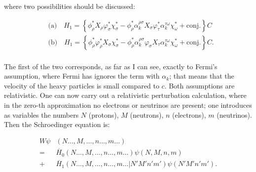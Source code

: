 \documentclass{article}
\newcommand{\nequ}[2]{
\begin{align*}
#1
\tag{#2}
\end{align*}
}
\begin{document}
where two possibilities should be discussed:
\nequ{
&\text{(a)}\quad H_1 = \left\{
\phi^*_\rho X_\rho \varphi^*_\sigma \chi^*_\sigma -
\phi^*_\rho \alpha^{\rho\sigma}_k X_\sigma \varphi^*_\tau \alpha^{\tau\omega}_k \chi^*_\omega + \text{conj.}
\right\}C\\
&\text{(b)}\quad H_1 = \left\{
\phi^*_\rho \varphi^*_\rho X_\sigma \chi^*_\sigma -
\phi^*_\rho \alpha^{\rho\sigma}_k \varphi_\sigma X_\tau \alpha^{\tau\omega}_k \chi^*_\omega + \text{conj.}
\right\}C.\\
}{2}
The first of the two corresponds, as far as I can see, exactly to Fermi's assumption, where Fermi has ignores the term with $\alpha_k$; that means that the velocity of the heavy particles is small compared to $c$. Both assumptions are relativistic. One can now carry out a relativistic perturbation calculation, where in the zero-th approximation no electrons or neutrinos are present; one introduces as variables the numbers $N$ (protons), $M$ (neutrons), $n$ (electrons), $m$ (neutrinos). Then the Schroedinger equation is:
\nequ{
W\psi &(N \dots, M, \dots, n \dots, m \dots)\\
 = &\overline{H}_0(N \dots, M, \dots, n \dots, m \dots)\psi(N,M,n,m)\\
 + &\overline{H}_1(N \dots, M, \dots, n \dots, m \dots|N'M'n'm')\psi(N'M'n'm').
}{3}
\end{document}
